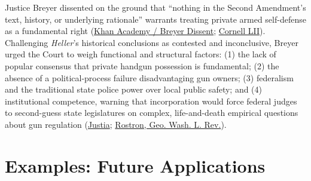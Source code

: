 \documentclass[12pt]{article}
\begin{document}
Justice Breyer dissented on the ground that ``nothing in the Second Amendment's text, history, or underlying rationale'' warrants treating private armed self-defense as a fundamental right (\href{https://www.khanacademy.org/humanities/constitution-101/x7a03a96a83aa80ff:the-bill-of-rights/x7a03a96a83aa80ff:second-amendment-modern-cases-and-debates/a/primary-source-mcdonald-v-city-of-chicago-2012}{Khan Academy / Breyer Dissent}; \href{https://www.law.cornell.edu/constitution-conan/amendment-2/post-heller-issues-and-application-of-second-amendment-to-states}{Cornell LII}). Challenging \textit{Heller}'s historical conclusions as contested and inconclusive, Breyer urged the Court to weigh functional and structural factors: (1) the lack of popular consensus that private handgun possession is fundamental; (2) the absence of a political-process failure disadvantaging gun owners; (3) federalism and the traditional state police power over local public safety; and (4) institutional competence, warning that incorporation would force federal judges to second-guess state legislatures on complex, life-and-death empirical questions about gun regulation (\href{https://supreme.justia.com/cases/federal/us/561/742/}{Justia}; \href{https://irlaw.umkc.edu/faculty_works/671/}{Rostron, Geo. Wash. L. Rev.}).

\section{Examples: Future Applications}
\end{document}
